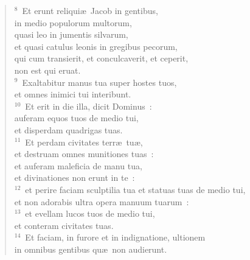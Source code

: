 \begin{flushleft}
\begin{verse}
${}^{8}$~Et erunt reliqui\ae\ Jacob in gentibus,\\ in medio populorum multorum,\\ quasi leo in jumentis silvarum,\\ et quasi catulus leonis in gregibus pecorum,\\ qui cum transierit, et conculcaverit, et ceperit,\\ non est qui eruat.\\
${}^{9}$~Exaltabitur manus tua super hostes tuos,\\ et omnes inimici tui interibunt.\\
${}^{10}$~Et erit in die illa, dicit Dominus~:\\ auferam equos tuos de medio tui,\\ et disperdam quadrigas tuas.\\
${}^{11}$~Et perdam civitates terr\ae\ tu\ae ,\\ et destruam omnes munitiones tuas~:\\ et auferam maleficia de manu tua,\\ et divinationes non erunt in te~:\\
${}^{12}$~et perire faciam sculptilia tua et statuas tuas de medio tui,\\ et non adorabis ultra opera manuum tuarum~:\\
${}^{13}$~et evellam lucos tuos de medio tui,\\ et conteram civitates tuas.\\
${}^{14}$~Et faciam, in furore et in indignatione, ultionem\\ in omnibus gentibus qu\ae\ non audierunt.\end{verse}\end{flushleft}


